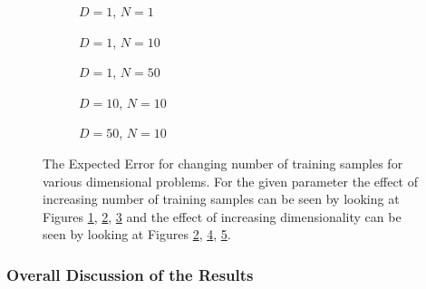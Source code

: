 \begin{figure}[!h]
  \centering
    \begin{subfigure}{0.33\textwidth}
      \centering
      \caption{$D=1$, $N=1$}
      \label{fig:nonlinear-c2-N-1-D-1}
    \end{subfigure}
    \begin{subfigure}{0.33\textwidth}
      \centering
      \caption{$D=1$, $N=10$}
      \label{fig:nonlinear-c2-N-10-D-1}
    \end{subfigure}
    \begin{subfigure}{0.33\textwidth}
      \centering
      \caption{$D=1$, $N=50$}
      \label{fig:nonlinear-c2-N-50-D-1}
    \end{subfigure}

    \begin{subfigure}{0.33\textwidth}
      \centering
      \caption{$D=10$, $N=10$}
      \label{fig:nonlinear-c2-N-10-D-10}
    \end{subfigure}
    \begin{subfigure}{0.33\textwidth}
      \centering
      \caption{$D=50$, $N=10$}
      \label{fig:nonlinear-c2-N-10-D-50}
    \end{subfigure}  

  \caption{The Expected Error for changing number of training samples for various dimensional problems. For the given parameter the effect of increasing number of training samples can be seen by looking at Figures \ref{fig:nonlinear-c2-N-1-D-1}, \ref{fig:nonlinear-c2-N-10-D-1}, \ref{fig:nonlinear-c2-N-50-D-1} and the effect of increasing dimensionality can be seen by looking at Figures \ref{fig:nonlinear-c2-N-10-D-1}, \ref{fig:nonlinear-c2-N-10-D-10}, \ref{fig:nonlinear-c2-N-10-D-50}.}\label{fig:nonlinear-c2}
\end{figure}

\subsubsection{Overall Discussion of the Results}

